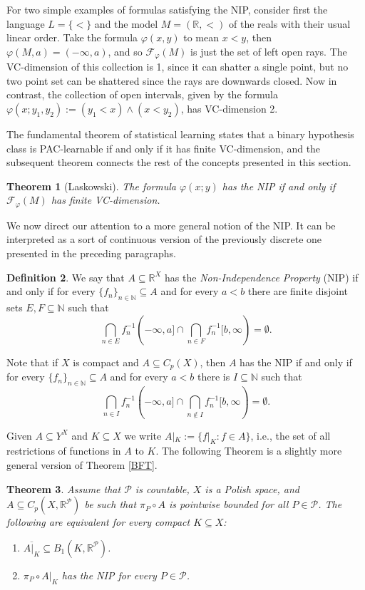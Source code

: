 \documentclass[psamsfonts]{amsart}
\newtheorem{thm}{Theorem}[section]
\theoremstyle{definition}
\newtheorem{defn}[thm]{Definition}
\theoremstyle{remark}
\numberwithin{equation}{section}
\begin{document}
For two simple examples of formulas satisfying the NIP, consider first the language $L=\{<\}$ and the model $M=(\mathbb R,<)$ of the reals with their usual linear order. Take the formula $\varphi(x,y)$ to mean $x<y$, then $\varphi(M,a)=(-\infty,a)$, and so $\mathcal F_\varphi(M)$ is just the set of left open rays. The VC-dimension of this collection is 1, since it can shatter a single point, but no two point set can be shattered since the rays are downwards closed. Now in contrast, the collection of open intervals, given by the formula $\varphi(x;y_1,y_2):=(y_1<x)\land(x<y_2)$, has VC-dimension 2.

The fundamental theorem of statistical learning states that a binary hypothesis class is PAC-learnable if and only if it has finite VC-dimension, and the subsequent theorem connects the rest of the concepts presented in this section.

\begin{thm}[Laskowski]
    The formula $\varphi(x;y)$ has the NIP if and only if $\mathcal F_\varphi(M)$ has finite VC-dimension.
\end{thm}

We now direct our attention to a more general notion of the NIP. It can be interpreted as a sort of continuous version of the previously discrete one presented in the preceding paragraphs.

\begin{defn}
    We say that $A\subseteq \mathbb{R}^X$ has the \emph{Non-Independence Property} (NIP) if and only if for every $\{f_n\}_{n\in\mathbb N}\subseteq A$ and for every $a<b$ there are finite disjoint sets $E,F\subseteq\mathbb{N}$ such that
    $$\bigcap_{n\in E}f_n^{-1}(-\infty,a]\cap\bigcap_{n\in F}f_n^{-1}[b,\infty)=\emptyset.$$
\end{defn}

Note that if $X$ is compact and $A\subseteq C_p(X)$, then $A$ has the NIP if and only if for every $\{f_n\}_{n\in\mathbb N}\subseteq A$ and for every $a<b$ there is $I\subseteq\mathbb{N}$ such that
$$\bigcap_{n\in I}f_n^{-1}(-\infty,a]\cap\bigcap_{n\notin I}f_n^{-1}[b,\infty)=\emptyset.$$

Given $A\subseteq Y^X$ and $K\subseteq X$ we write $A|_K:=\{f|_K:f\in A\}$, i.e., the set of all restrictions of functions in $A$ to $K$. The following Theorem is a slightly more general version of Theorem \ref{BFT}.

\begin{thm}\label{Generalized BFT}
    Assume that $\mathcal P$ is countable, $X$ is a Polish space, and $A\subseteq C_p(X,\mathbb R^\mathcal P)$ be such that $\pi_P\circ A$ is pointwise bounded for all $P\in\mathcal{P}$. The following are equivalent for every compact $K\subseteq X$:

    \begin{enumerate}
        \item $\overline{A|_K}\subseteq B_1(K,\mathbb R^\mathcal P)$.
        \item $\pi_P\circ A|_K$ has the NIP for every $P\in\mathcal P$.
    \end{enumerate}
\end{thm}
\end{document}

